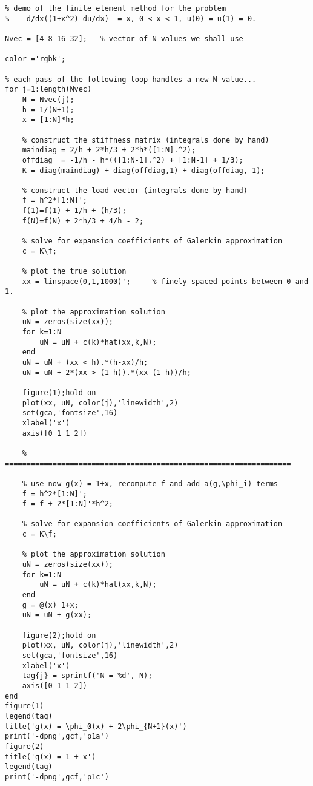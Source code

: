 {\footnotesize \begin{verbatim}
% demo of the finite element method for the problem
%   -d/dx((1+x^2) du/dx)  = x, 0 < x < 1, u(0) = u(1) = 0.

Nvec = [4 8 16 32];   % vector of N values we shall use

color ='rgbk';

% each pass of the following loop handles a new N value...
for j=1:length(Nvec)
    N = Nvec(j);
    h = 1/(N+1);
    x = [1:N]*h;
    
    % construct the stiffness matrix (integrals done by hand)
    maindiag = 2/h + 2*h/3 + 2*h*([1:N].^2);
    offdiag  = -1/h - h*(([1:N-1].^2) + [1:N-1] + 1/3);
    K = diag(maindiag) + diag(offdiag,1) + diag(offdiag,-1);
    
    % construct the load vector (integrals done by hand)
    f = h^2*[1:N]';
    f(1)=f(1) + 1/h + (h/3);
    f(N)=f(N) + 2*h/3 + 4/h - 2;

    % solve for expansion coefficients of Galerkin approximation
    c = K\f;
    
    % plot the true solution
    xx = linspace(0,1,1000)';     % finely spaced points between 0 and 1.                
    
    % plot the approximation solution
    uN = zeros(size(xx));
    for k=1:N
        uN = uN + c(k)*hat(xx,k,N);
    end
    uN = uN + (xx < h).*(h-xx)/h;
    uN = uN + 2*(xx > (1-h)).*(xx-(1-h))/h;
    
    figure(1);hold on
    plot(xx, uN, color(j),'linewidth',2)
    set(gca,'fontsize',16)
    xlabel('x')
    axis([0 1 1 2])
    
    % ================================================================== 
    
    % use now g(x) = 1+x, recompute f and add a(g,\phi_i) terms
    f = h^2*[1:N]'; 
    f = f + 2*[1:N]'*h^2;
    
    % solve for expansion coefficients of Galerkin approximation
    c = K\f;

    % plot the approximation solution
    uN = zeros(size(xx));
    for k=1:N
        uN = uN + c(k)*hat(xx,k,N);
    end
    g = @(x) 1+x;
    uN = uN + g(xx);
    
    figure(2);hold on
    plot(xx, uN, color(j),'linewidth',2)
    set(gca,'fontsize',16)
    xlabel('x')
    tag{j} = sprintf('N = %d', N);    
    axis([0 1 1 2])
end
figure(1)
legend(tag)
title('g(x) = \phi_0(x) + 2\phi_{N+1}(x)')
print('-dpng',gcf,'p1a')
figure(2)
title('g(x) = 1 + x')
legend(tag)
print('-dpng',gcf,'p1c')

\end{verbatim}}
